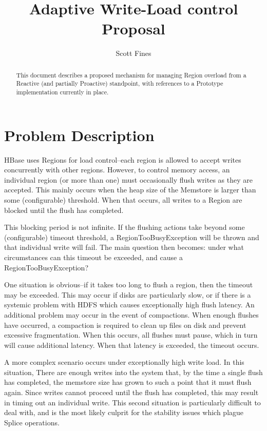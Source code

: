\documentclass[11pt]{article}
\begin{document}
\title{Adaptive Write-Load control Proposal}
\author{Scott Fines}

\maketitle

\begin{abstract}
This document describes a proposed mechanism for managing Region overload from a Reactive (and partially Proactive) standpoint, with 
references to a Prototype implementation currently in place.
\end{abstract}

\section{Problem Description}
HBase uses Regions for load control--each region is allowed to accept writes concurrently with other regions. However, to control memory access, an individual 
region (or more than one) must occasionally flush writes as they are accepted. This mainly occurs when the heap size of the Memstore is larger than some (configurable)
threshold. When that occurs, all writes to a Region are blocked until the flush has completed.

This blocking period is not infinite. If the flushing actions take beyond some (configurable) timeout threshold, a RegionTooBusyException will be thrown and that
individual write will fail. The main question then becomes: under what circumstances can this timeout be exceeded, and cause a RegionTooBusyException? 

One situation is obvious--if it takes too long to flush a region, then the timeout may be exceeded. 
This may occur if disks are particularly slow, or if there is a systemic problem with HDFS which causes exceptionally high flush latency. An additional
problem may occur in the event of compactions. When enough flushes have occurred, a compaction is required to clean up files on disk and prevent excessive fragmentation.
When this occurs, all flushes must pause, which in turn will cause additional latency. When that latency is exceeded, the timeout occurs.

A more complex scenario occurs under exceptionally high write load. In this situation, There are enough writes into the system that, by the time a single flush
has completed, the memstore size has grown to such a point that it must flush again. Since writes cannot proceed until the flush has completed, this may result
in timing out an individual write. This second situation is particularly difficult to deal with, and is the most likely culprit
for the stability issues which plague Splice operations.
\end{document}
